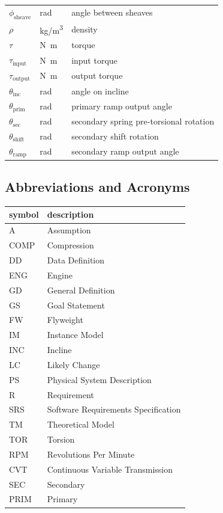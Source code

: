 \documentclass[12pt]{article}
\begin{document}
\begin{longtable*}{l l p{12cm}}
$\phi_{\text{sheave}}$ & \si[per-mode=symbol] {\radian} & angle between sheaves \\
$\rho$ & \si[per-mode=symbol] {\kilogram\per\metre\cubed} & density \\
$\tau$ & \si[per-mode=symbol] {\newton\metre} & torque \\
$\tau_{\text{input}}$ & \si[per-mode=symbol] {\newton\metre} & input torque \\
$\tau_{\text{output}}$ & \si[per-mode=symbol] {\newton\metre} & output torque \\
$\theta_{\text{inc}}$ & \si[per-mode=symbol] {\radian} & angle on incline \\
$\theta_{\text{prim}}$ & \si[per-mode=symbol] {\radian} & primary ramp output angle \\
$\theta_{\text{sec}}$ & \si[per-mode=symbol] {\radian} & secondary spring pre-torsional rotation \\
$\theta_{\text{shift}}$ & \si[per-mode=symbol] {\radian} & secondary shift rotation \\
$\theta_{\text{ramp}}$ & \si[per-mode=symbol] {\radian} & secondary ramp output angle \\
\bottomrule
\end{longtable*}

\subsection{Abbreviations and Acronyms}

\renewcommand{\arraystretch}{1.2}
\begin{tabular}{l l} 
  \toprule		
  \textbf{symbol} & \textbf{description}\\
  \midrule 
  A & Assumption\\
  COMP & Compression\\
  DD & Data Definition\\
  ENG & Engine \\
  GD & General Definition\\
  GS & Goal Statement\\
  FW & Flyweight\\
  IM & Instance Model\\
  INC & Incline\\
  LC & Likely Change\\
  PS & Physical System Description\\
  R & Requirement\\
  SRS & Software Requirements Specification\\
  TM & Theoretical Model\\
  TOR & Torsion\\
  RPM & Revolutions Per Minute\\
  CVT & Continuous Variable Transmission\\
  SEC & Secondary\\
  PRIM & Primary\\
  \bottomrule
\end{tabular}\\
\end{document}
